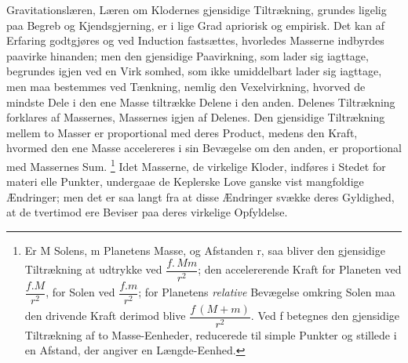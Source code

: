 \documentclass[12pt,a4paper]{book}
\begin{document}
Gravitationslæren, Læren om Klodernes gjensidige Tiltrækning,
grundes ligelig paa Begreb og Kjendsgjerning, er i lige Grad
apriorisk og empirisk. Det kan af Erfaring godtgjøres og ved
Induction fastsættes, hvorledes Masserne indbyrdes paavirke
hinanden; men den gjensidige Paavirkning, som lader sig iagttage,
begrundes igjen ved en Virk\-%
somhed, som ikke umiddelbart lader sig iagttage, men maa bestemmes
ved Tænkning, nemlig den Vexelvirkning, hvorved de mindste Dele i
den ene Masse tiltrække Delene i den anden. Delenes Tiltrækning
forklares af Massernes, Massernes igjen af Delenes. Den gjensidige
Tiltrækning mellem to Masser er proportional med deres Product,
medens den Kraft, hvormed den ene Masse accelereres i sin Bevægelse
om den anden, er proportional med Massernes Sum.%
\footnote{%
Er M Solens, m Planetens Masse, og Afstanden r, saa bliver den
gjensidige Tiltrækning at udtrykke ved $\dfrac{f.\,Mm}{r^{2}}$; den
accelererende Kraft for Planeten ved $\dfrac{f.M}{r^{2}}$, for Solen
ved $\dfrac{f.m}{r^{2}}$; for Planetens \emph{relative} Bevægelse
omkring Solen maa den drivende Kraft derimod blive
$\dfrac{f\,(M + m)}{r^{2}}$. Ved f betegnes den gjensidige
Tiltrækning af to Masse-Eenheder, reducerede til simple Punkter og
stillede i en Afstand, der angiver en Længde-Eenhed.}
Idet Masserne, de virkelige Kloder, indføres i Stedet for materi\-%
elle Punkter, undergaae de Keplerske Love ganske vist mangfoldige
Ændringer; men det er saa langt fra at disse Ændringer svække deres
Gyldighed, at de tvertimod ere Beviser paa deres virkelige
Opfyldelse.
\end{document}
